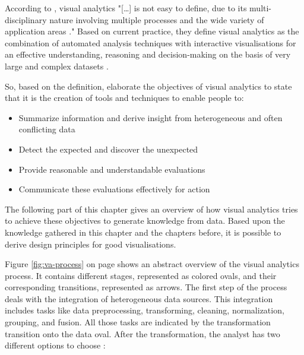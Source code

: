 According to \citeauthor{Keim2010}, visual analytics "[\ldots] is not easy to define, due to its multi-disciplinary nature involving multiple processes and the wide variety of application areas ." Based on current practice, they define visual analytics as the combination of automated analysis techniques with interactive visualisations for an effective understanding, reasoning and decision-making on the basis of very large and complex datasets .

So, based on the definition, \citeauthor{Keim2010} elaborate the objectives of visual analytics to state that it is the creation of tools and techniques to enable people to:

\begin{itemize}
\item Summarize information and derive insight from heterogeneous and often conflicting data
\item Detect the expected and discover the unexpected
\item Provide reasonable and understandable evaluations
\item Communicate these evaluations effectively for action
\end{itemize}

The following part of this chapter gives an overview of how visual analytics tries to achieve these objectives to generate knowledge from data. Based upon the knowledge gathered in this chapter and the chapters before, it is possible to derive design principles for good visualisations.

Figure \ref{fig:va-process} on page \pageref{fig:va-process} shows an abstract overview of the visual analytics process. It contains different stages, represented as colored ovals, and their corresponding transitions, represented as arrows. The first step of the process deals with the integration of heterogeneous data sources. This integration includes tasks like data preprocessing, transforming, cleaning, normalization, grouping, and fusion. All those tasks are indicated by the transformation transition onto the data oval. After the transformation, the analyst has two different options to choose :

